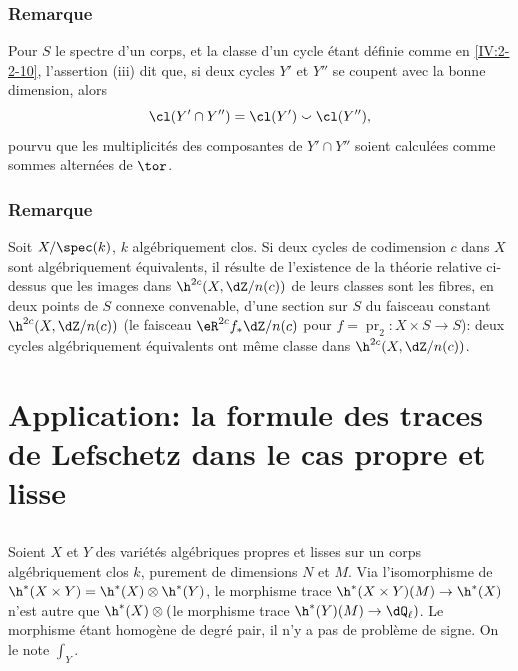 \subsubsection{Remarque}\label{IV:2-3-9}

Pour $S$ le spectre d'un corps, et la classe d'un cycle étant définie comme 
en \ref{IV:2-2-10}, l'assertion (iii) dit que, si deux cycles $Y'$ et $Y''$ se 
coupent avec la bonne dimension, alors 
\[
  \cl(Y'\cap Y'') = \cl(Y')\smallsmile \cl(Y'')\text{,}
\]
pourvu que les multiplicités des composantes de $Y'\cap Y''$ soient 
calculées comme sommes alternées de $\tor$. 





\subsubsection{Remarque}\label{IV:2-3-10}

Soit $X/\spec(k)$, $k$ algébriquement clos. Si deux cycles de codimension $c$ 
dans $X$ sont algébriquement équivalents, il résulte de l'existence de la 
théorie relative ci-dessus que les images dans $\h^{2 c}(X,\dZ/n(c))$ de 
leurs classes sont les fibres, en deux points de $S$ connexe convenable, d'une 
section sur $S$ du faisceau constant $\h^{2 c}(X,\dZ/n(c))$ (le faisceau 
$\eR^{2 c} f_\ast \dZ/n(c)$ pour $f=\operatorname{pr}_2:X\times S\to S$): deux 
cycles algébriquement équivalents ont même classe dans 
$\h^{2 c}(X,\dZ/n(c))$. 




















\section{Application: la formule des traces de Lefschetz dans le cas propre et lisse}\label{IV:3}





\subsection{}\label{IV:3-1}

Soient $X$ et $Y$ des variétés algébriques propres et lisses sur un corps 
algébriquement clos $k$, purement de dimensions $N$ et $M$. Via 
l'isomorphisme de  
$\h^*(X\times Y)=\h^*(X)\otimes \h^*(Y)$, le morphisme trace 
$\h^*(X\times Y)(M)\to \h^*(X)$ n'est autre que 
$\h^*(X)\otimes ($le morphisme trace $\h^*(Y)(M)\to \dQ_\ell)$. Le 
morphisme étant homogène de degré pair, il n'y a pas de problème de 
signe. On le note $\int_Y$. 





